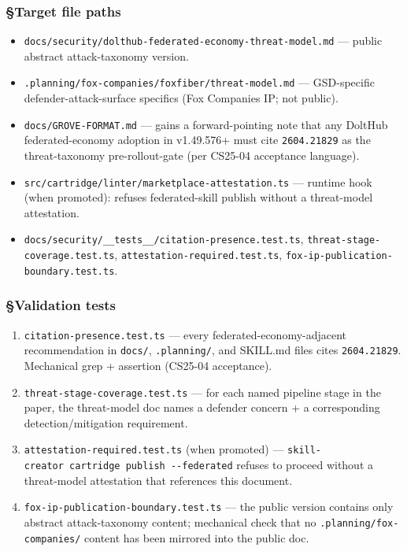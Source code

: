 \documentclass[11pt,letterpaper]{article}
\newcommand{\arxivid}[1]{\texttt{\textcolor{accent}{#1}}}
\providecommand{\tightlist}{\setlength{\itemsep}{0pt}\setlength{\parskip}{0pt}}
\begin{document}
\subsubsection{§Target file paths}

\begin{itemize}
\tightlist
\item
  \texttt{docs/security/dolthub-federated-economy-threat-model.md} ---
  public abstract attack-taxonomy version.
\item
  \texttt{.planning/fox-companies/foxfiber/threat-model.md} ---
  GSD-specific defender-attack-surface specifics (Fox Companies IP; not
  public).
\item
  \texttt{docs/GROVE-FORMAT.md} --- gains a forward-pointing note that
  any DoltHub federated-economy adoption in v1.49.576+ must cite
  \arxivid{2604.21829} as the threat-taxonomy pre-rollout-gate (per
  CS25-04 acceptance language).
\item
  \texttt{src/cartridge/linter/marketplace-attestation.ts} --- runtime
  hook (when promoted): refuses federated-skill publish without a
  threat-model attestation.
\item
  \texttt{docs/security/\_\_tests\_\_/citation-presence.test.ts},
  \texttt{threat-stage-coverage.test.ts},
  \texttt{attestation-required.test.ts},
  \texttt{fox-ip-publication-boundary.test.ts}.
\end{itemize}

\subsubsection{§Validation tests}

\begin{enumerate}
\def\labelenumi{\arabic{enumi}.}
\tightlist
\item
  \texttt{citation-presence.test.ts} --- every
  federated-economy-adjacent recommendation in \texttt{docs/},
  \texttt{.planning/}, and SKILL.md files cites \arxivid{2604.21829}.
  Mechanical grep + assertion (CS25-04 acceptance).
\item
  \texttt{threat-stage-coverage.test.ts} --- for each named pipeline
  stage in the paper, the threat-model doc names a defender concern + a
  corresponding detection/mitigation requirement.
\item
  \texttt{attestation-required.test.ts} (when promoted) ---
  \texttt{skill-creator\ cartridge\ publish\ -\/-federated} refuses to
  proceed without a threat-model attestation that references this
  document.
\item
  \texttt{fox-ip-publication-boundary.test.ts} --- the public version
  contains only abstract attack-taxonomy content; mechanical check that
  no \texttt{.planning/fox-companies/} content has been mirrored into
  the public doc.
\end{enumerate}
\end{document}
